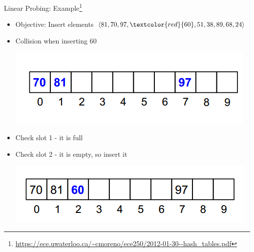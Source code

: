 \documentclass{beamer}
\begin{document}
\begin{frame}{Linear Probing: Example\footnote{\url{https://ece.uwaterloo.ca/~cmoreno/ece250/2012-01-30--hash_tables.pdf}}}
    \begin{itemize}
        \item Objective: Insert elements $\langle 81, 70, 97, \textcolor{red}{60}, 51, 38, 89, 68, 24 \rangle$ 
        \item Collision when inserting $60$ 
        \begin{center}
            \includegraphics[scale=0.5]{linearProbing2.png} \pause
        \end{center}
        \item Check slot 1 - it is full
        \item Check slot 2 - it is empty, so insert it
        \begin{center}
            \includegraphics[scale=0.5]{linearProbing3.png}
        \end{center}
    \end{itemize}
\end{frame}
\end{document}
